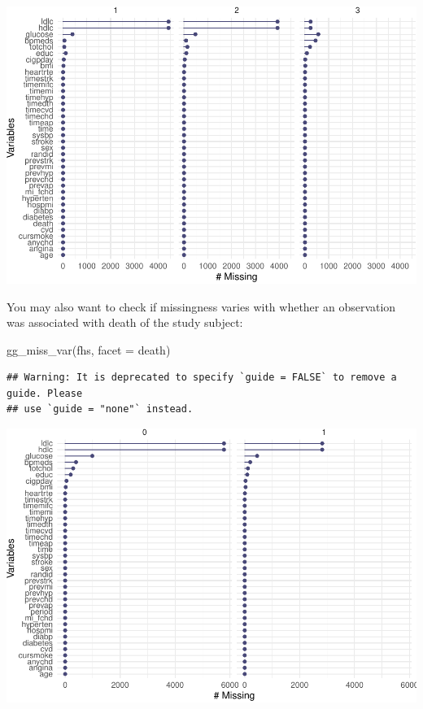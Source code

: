 \documentclass[
]{book}
\newenvironment{Shaded}{\begin{snugshade}}{\end{snugshade}}
\newcommand{\AttributeTok}[1]{\textcolor[rgb]{0.77,0.63,0.00}{#1}}
\newcommand{\FunctionTok}[1]{\textcolor[rgb]{0.00,0.00,0.00}{#1}}
\newcommand{\NormalTok}[1]{#1}
\begin{document}
\includegraphics{adv_epi_analysis_files/figure-latex/unnamed-chunk-175-1.pdf}

You may also want to check if missingness varies with whether an observation
was associated with death of the study subject:

\begin{Shaded}
\begin{Highlighting}[]
\FunctionTok{gg\_miss\_var}\NormalTok{(fhs, }\AttributeTok{facet =}\NormalTok{ death)}
\end{Highlighting}
\end{Shaded}

\begin{verbatim}
## Warning: It is deprecated to specify `guide = FALSE` to remove a guide. Please
## use `guide = "none"` instead.
\end{verbatim}

\includegraphics{adv_epi_analysis_files/figure-latex/unnamed-chunk-176-1.pdf}
\end{document}
